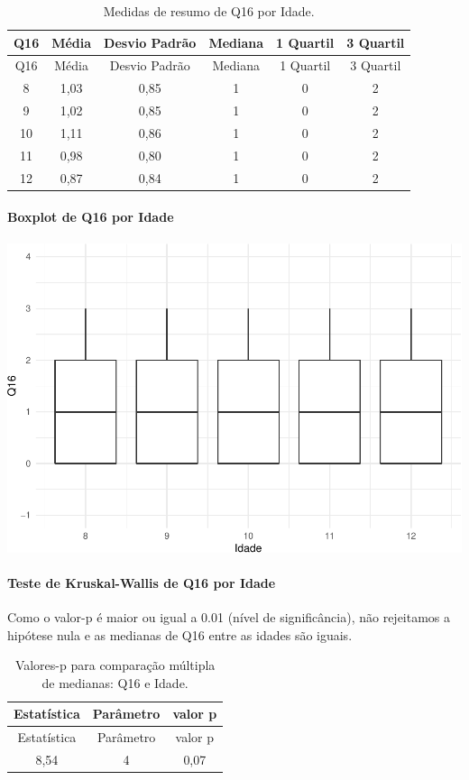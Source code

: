 \documentclass[]{article}
\let\oldparagraph\paragraph
\renewcommand{\paragraph}[1]{\oldparagraph{#1}\mbox{}}
\begin{document}
\begin{longtable}[]{@{}cccccc@{}}
\caption{\label{tab:unnamed-chunk-155}Medidas de resumo de Q16 por Idade.}\tabularnewline
\toprule
Q16 & Média & Desvio Padrão & Mediana & 1 Quartil & 3 Quartil\tabularnewline
\midrule
\endfirsthead
\toprule
Q16 & Média & Desvio Padrão & Mediana & 1 Quartil & 3 Quartil\tabularnewline
\midrule
\endhead
8 & 1,03 & 0,85 & 1 & 0 & 2\tabularnewline
9 & 1,02 & 0,85 & 1 & 0 & 2\tabularnewline
10 & 1,11 & 0,86 & 1 & 0 & 2\tabularnewline
11 & 0,98 & 0,80 & 1 & 0 & 2\tabularnewline
12 & 0,87 & 0,84 & 1 & 0 & 2\tabularnewline
\bottomrule
\end{longtable}

\hypertarget{boxplot-de-q16-por-idade}{%
\paragraph{Boxplot de Q16 por Idade}\label{boxplot-de-q16-por-idade}}

\begin{center}\includegraphics[width=0.75\linewidth]{relatorio_covid19_files/figure-latex/unnamed-chunk-156-1} \end{center}

\hypertarget{teste-de-kruskal-wallis-de-q16-por-idade}{%
\paragraph{Teste de Kruskal-Wallis de Q16 por Idade}\label{teste-de-kruskal-wallis-de-q16-por-idade}}

Como o valor-p é maior ou igual a 0.01 (nível de significância), não rejeitamos a hipótese nula e as medianas de Q16 entre as idades são iguais.

\begin{longtable}[]{@{}ccc@{}}
\caption{\label{tab:unnamed-chunk-158}Valores-p para comparação múltipla de medianas: Q16 e Idade.}\tabularnewline
\toprule
Estatística & Parâmetro & valor p\tabularnewline
\midrule
\endfirsthead
\toprule
Estatística & Parâmetro & valor p\tabularnewline
\midrule
\endhead
8,54 & 4 & 0,07\tabularnewline
\bottomrule
\end{longtable}
\end{document}
